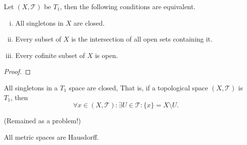 

\begin{proposition}
	\label{prop: alternative definitions of T_1 spaces}
	Let $(X, \mathcal T)$ be $T_1$, then the following conditions are equivalent.
	\begin{enumerate}[(i)]
		\item All singletons in $X$ are closed.
		\item Every subset of $X$ is the intersection of all open sets containing it.
		\item Every cofinite subset of $X$ is open.
	\end{enumerate}
	
	\begin{proof}
		
	\end{proof}
\end{proposition}


\begin{proposition}
	\label{prop: all singletons in a T_1 space are closed}
	
	All singletons in a $T_1$ space are closed, That is, if a topological space $(X, \mathcal T)$ is $T_1$, then
	$$
	\forall x \in (X, \mathcal T) : \exists U \in \mathcal T : \{x\} = X \setminus U.
	$$
\end{proposition}





\begin{example}
	\label{eg: R_0 but not R_1}
	(Remained as a problem!)
\end{example}




\begin{proposition}
	All metric spaces are Hausdorff.
\end{proposition}



